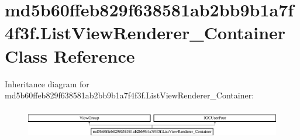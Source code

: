 \hypertarget{classmd5b60ffeb829f638581ab2bb9b1a7f4f3f_1_1ListViewRenderer__Container}{}\section{md5b60ffeb829f638581ab2bb9b1a7f4f3f.\+List\+View\+Renderer\+\_\+\+Container Class Reference}
\label{classmd5b60ffeb829f638581ab2bb9b1a7f4f3f_1_1ListViewRenderer__Container}
Inheritance diagram for md5b60ffeb829f638581ab2bb9b1a7f4f3f.\+List\+View\+Renderer\+\_\+\+Container\+:\begin{figure}[H]
\begin{center}
\leavevmode
\includegraphics[height=1.349398cm]{classmd5b60ffeb829f638581ab2bb9b1a7f4f3f_1_1ListViewRenderer__Container}
\end{center}
\end{figure}
